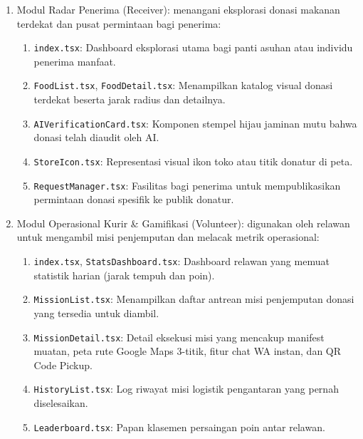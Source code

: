 \begin{enumerate}[label=\arabic*.]
    \item Modul Radar Penerima (Receiver): menangani eksplorasi donasi makanan terdekat dan pusat permintaan bagi penerima:
    \begin{enumerate}[label=\alph*.]
        \item \texttt{index.tsx}: Dashboard eksplorasi utama bagi panti asuhan atau individu penerima manfaat.
        \item \texttt{FoodList.tsx}, \texttt{FoodDetail.tsx}: Menampilkan katalog visual donasi terdekat beserta jarak radius dan detailnya.
        \item \texttt{AIVerificationCard.tsx}: Komponen stempel hijau jaminan mutu bahwa donasi telah diaudit oleh AI.
        \item \texttt{StoreIcon.tsx}: Representasi visual ikon toko atau titik donatur di peta.
        \item \texttt{RequestManager.tsx}: Fasilitas bagi penerima untuk mempublikasikan permintaan donasi spesifik ke publik donatur.
    \end{enumerate}

    \item Modul Operasional Kurir \& Gamifikasi (Volunteer): digunakan oleh relawan untuk mengambil misi penjemputan dan melacak metrik operasional:
    \begin{enumerate}[label=\alph*.]
        \item \texttt{index.tsx}, \texttt{StatsDashboard.tsx}: Dashboard relawan yang memuat statistik harian (jarak tempuh dan poin).
        \item \texttt{MissionList.tsx}: Menampilkan daftar antrean misi penjemputan donasi yang tersedia untuk diambil.
        \item \texttt{MissionDetail.tsx}: Detail eksekusi misi yang mencakup manifest muatan, peta rute Google Maps 3-titik, fitur chat WA instan, dan QR Code Pickup.
        \item \texttt{HistoryList.tsx}: Log riwayat misi logistik pengantaran yang pernah diselesaikan.
        \item \texttt{Leaderboard.tsx}: Papan klasemen persaingan poin antar relawan.
    \end{enumerate}


\end{enumerate}
